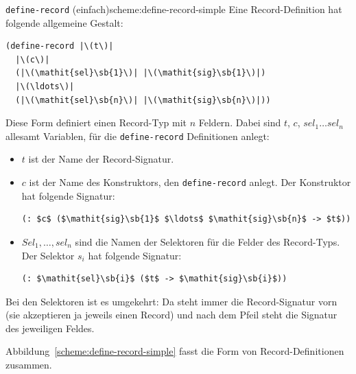 \begin{feature}{\lstinline{define-record} (einfach)}{scheme:define-record-simple}
Eine Record-Definition
hat folgende allgemeine Gestalt:\label{def:define-record}
%
\begin{lstlisting}
(define-record |\(t\)|
  |\(c\)|
  (|\(\mathit{sel}\sb{1}\)| |\(\mathit{sig}\sb{1}\)|)
  |\(\ldots\)|
  (|\(\mathit{sel}\sb{n}\)| |\(\mathit{sig}\sb{n}\)|))
\end{lstlisting}
%
Diese Form definiert einen Record-Typ mit $n$ Feldern.
Dabei sind $t$, $c$, $\mathit{sel}_1 \ldots \mathit{sel}_n$ allesamt Variablen, für die
\lstinline{define-record} Definitionen anlegt:
%
\begin{itemize}
\item $t$ ist der Name der Record-Signatur.
\item $c$ ist der Name des Konstruktors, den
  \lstinline{define-record} anlegt.  Der Konstruktor hat 
  folgende Signatur:
%  
\begin{lstlisting}
(: $c$ ($\mathit{sig}\sb{1}$ $\ldots$ $\mathit{sig}\sb{n}$ -> $t$))
\end{lstlisting}
\item $\mathit{Sel}_1, \ldots, \mathit{sel}_n$ sind die Namen der Selektoren für die Felder
  des Record-Typs.  Der Selektor $s_i$ hat folgende Signatur:
% 
\begin{lstlisting}
(: $\mathit{sel}\sb{i}$ ($t$ -> $\mathit{sig}\sb{i}$))
\end{lstlisting}
\end{itemize}
%
\end{feature}

Bei den Selektoren ist es umgekehrt: Da steht immer die Record-Signatur
vorn (sie akzeptieren ja jeweils einen Record) und nach dem Pfeil
steht die Signatur des jeweiligen Feldes.

Abbildung~\ref{scheme:define-record-simple} fasst die Form
von Record-Definitionen zusammen.

